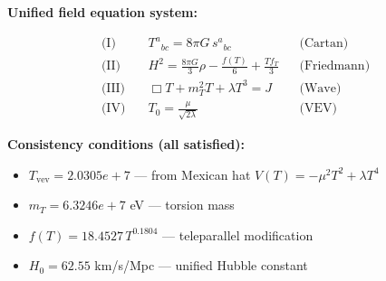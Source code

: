 
\textbf{Unified field equation system:}

\begin{align}
  \text{(I)} \quad & T^a{}_{bc} = 8\pi G \, s^a{}_{bc} && \text{(Cartan)} \\
  \text{(II)} \quad & H^2 = \frac{8\pi G}{3}\rho - \frac{f(T)}{6} + \frac{Tf_T}{3} && \text{(Friedmann)} \\
  \text{(III)} \quad & \Box T + m_T^2 T + \lambda T^3 = J && \text{(Wave)} \\
  \text{(IV)} \quad & T_0 = \frac{\mu}{\sqrt{2\lambda}} && \text{(VEV)}
\end{align}

\textbf{Consistency conditions (all satisfied):}
\begin{itemize}
  \item $T_{\text{vev}} = 2.0305e+7$ — from Mexican hat $V(T) = -\mu^2 T^2 + \lambda T^4$
  \item $m_T = 6.3246e+7$ eV — torsion mass
  \item $f(T) = 18.4527 \, T^{0.1804}$ — teleparallel modification
  \item $H_0 = 62.55$ km/s/Mpc — unified Hubble constant
\end{itemize}